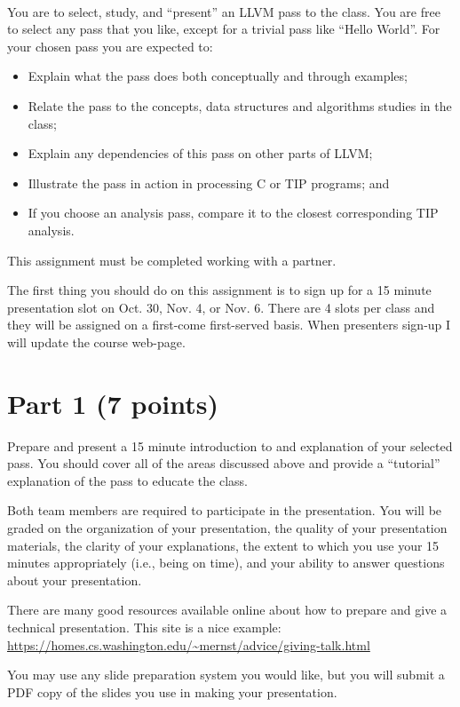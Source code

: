 \documentclass[12pt,letterpaper]{article}
\begin{document}
~

You are to select, study, and ``present'' an LLVM pass to the class.
You are free to select any pass that you like, except for a trivial
pass like ``Hello World''.
For your chosen pass you are expected to:
\begin{itemize}
\item Explain what the pass does both conceptually and through examples;
\item Relate the pass to the concepts, data structures and algorithms studies in the class;
\item Explain any dependencies of this pass on other parts of LLVM;
\item Illustrate the pass in action in processing C or TIP programs; and
\item If you choose an analysis pass, compare it to the closest corresponding TIP analysis. 
\end{itemize}

This assignment must be completed working with a partner.

The first thing you should do on this assignment is to sign up for
a 15 minute presentation slot on Oct. 30, Nov. 4, or Nov. 6.  There are
4 slots per class and they will be assigned on a first-come first-served
basis.  When presenters sign-up I will update the course web-page.

\section*{Part 1 (7 points)}
Prepare and present a 15 minute introduction to and explanation of your
selected pass.  You should cover all of the areas discussed above and 
provide a ``tutorial'' explanation of the pass to educate the class.

Both team members are required to participate in the presentation.
You will be graded on the organization of your presentation,
the quality of your presentation materials,
the clarity of your explanations,
the extent to which you use your 15 minutes appropriately (i.e., being
on time),
and your ability to answer questions about your presentation. 

There are many good resources available online about how to prepare
and give a technical presentation.  This site is a nice example:
\url{https://homes.cs.washington.edu/~mernst/advice/giving-talk.html}

You may use any slide preparation system you would like, but you 
will submit a PDF copy of the slides you use in making your presentation.
\end{document}
